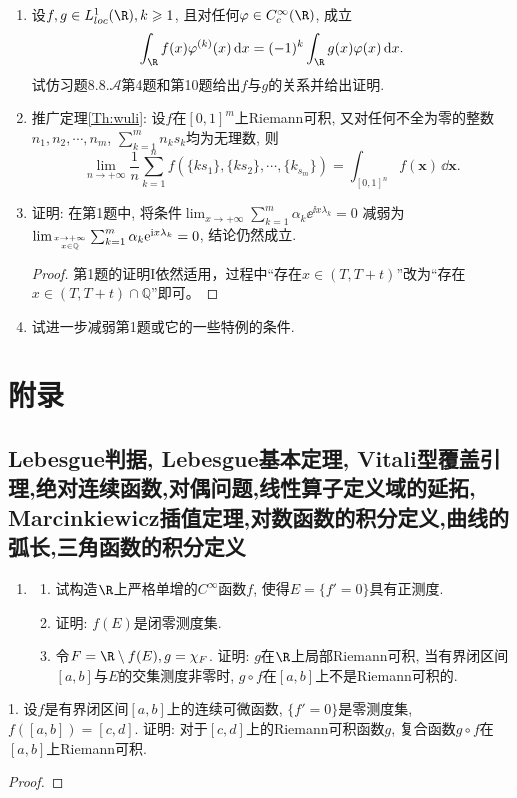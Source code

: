 \begin{quizb}
\begin{enumerate}
\begin{proof}
\begin{enumerate}
   $c_i$由上式归纳地给出.


\end{enumerate}
\end{proof}

\item 设\(f,g\in L_{loc}^1(\R),k\geqslant 1\), 
且对任何\(\varphi\in C_c^{\infty}(\R)\), 成立
\[\int_{\R}f(x)\varphi^{(k)}(x)\,\dd x=(-1)^k\int_{\R}g(x)\varphi(x)\,\dd x.\]
试仿习题8.8.\(\boldsymbol{\mathcal{A}}\)第4题和第10题给出\(f\)与\(g\)的关系并给出证明.

\item 推广定理\ref{Th:wuli}: 设\(f\)在\([0,1]^m\)上Riemann可积, 
又对任何不全为零的整数\(n_1,n_2,\cdots,n_m\), \(\sum_{k=1}^{m}n_ks_k\)均为无理数, 则
\[\lim_{n\rightarrow+\infty}\frac{1}{n}\sum_{k=1}^{n}f(\{ks_1\},\{ks_2\},\cdots,\{k_{s_m}\})
=\int_{[0,1]^n}f(\boldsymbol{x})\,\dd\boldsymbol{x}.\]

\item 证明: 在第1题中, 将条件\(\lim_{x\rightarrow+\infty}\sum_{k=1}^{m}\alpha_k\ee^{\ii x\lambda_k}=0\)
减弱为\(\lim_{x\rightarrow+\infty\atop x\in\mathbb{Q}}\sum_{k=1}^{m}\alpha_k\mathrm{e}^{{\rm i} x\lambda_k}=0\), 结论仍然成立.
\begin{proof}
    第1题的证明I依然适用，过程中``存在$x\in(T,T+t)$''改为``存在$x\in(T,T+t)\cap\mathbb{Q}$''即可。
\end{proof}
\item 试进一步减弱第1题或它的一些特例的条件.
\end{enumerate}
\end{quizb}

\section{附录}
\subsection{Lebesgue判据, Lebesgue基本定理, Vitali型覆盖引理,绝对连续函数,对偶问题,线性算子定义域的延拓, Marcinkiewicz插值定理,对数函数的积分定义,曲线的弧长,三角函数的积分定义}
\begin{quiza}
\begin{enumerate}
\item \begin{enumerate}[label=(\arabic*)]
\item 试构造\(\R\)上严格单增的\(C^\infty\)函数\(f\), 使得\(E=\{f'=0\}\)具有正测度.
\item 证明: \(f(E)\)是闭零测度集.
\item 令\(F=\R\setminus f(E),g=\chi_F\). 证明: \(g\)在\(\R\)上局部Riemann可积, 
当有界闭区间\([a,b]\)与\(E\)的交集测度非零时, \(g\circ f\)在\([a,b]\)上不是Riemann可积的.
\end{enumerate}
\end{enumerate}
\end{quiza}

\begin{quizb}
1. 设\(f\)是有界闭区间\([a,b]\)上的连续可微函数, \(\{f'=0\}\)是零测度集, 
\(f([a,b])=[c,d]\). 证明: 对于\([c,d]\)上的Riemann可积函数\(g\), 
复合函数\(g\circ f\)在\([a,b]\)上Riemann可积.
\begin{proof}

\end{proof}
\end{quizb}